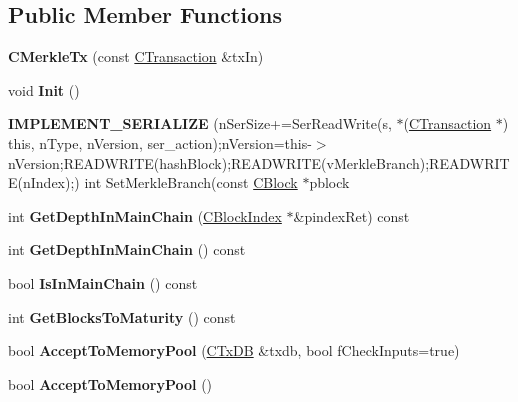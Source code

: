 \subsection*{Public Member Functions}
\begin{DoxyCompactItemize}
\item 
\mbox{\label{class_c_merkle_tx_aaf4aeddb032c6bb34559fa443bfc3476}} 
{\bfseries C\+Merkle\+Tx} (const \mbox{\hyperlink{class_c_transaction}{C\+Transaction}} \&tx\+In)
\item 
\mbox{\label{class_c_merkle_tx_ac57628e321f98642976d06b6cc231162}} 
void {\bfseries Init} ()
\item 
\mbox{\label{class_c_merkle_tx_a1cebdb140132c4af03a4cc264a21f118}} 
{\bfseries I\+M\+P\+L\+E\+M\+E\+N\+T\+\_\+\+S\+E\+R\+I\+A\+L\+I\+ZE} (n\+Ser\+Size+=Ser\+Read\+Write(s, $\ast$(\mbox{\hyperlink{class_c_transaction}{C\+Transaction}} $\ast$) this, n\+Type, n\+Version, ser\+\_\+action);n\+Version=this-\/$>$n\+Version;R\+E\+A\+D\+W\+R\+I\+TE(hash\+Block);R\+E\+A\+D\+W\+R\+I\+TE(v\+Merkle\+Branch);R\+E\+A\+D\+W\+R\+I\+TE(n\+Index);) int Set\+Merkle\+Branch(const \mbox{\hyperlink{class_c_block}{C\+Block}} $\ast$pblock
\item 
\mbox{\label{class_c_merkle_tx_a5c341e09db0ee897cef3a1ceba9fddf8}} 
int {\bfseries Get\+Depth\+In\+Main\+Chain} (\mbox{\hyperlink{class_c_block_index}{C\+Block\+Index}} $\ast$\&pindex\+Ret) const
\item 
\mbox{\label{class_c_merkle_tx_a297197f9fc39553e527de4eb6c995004}} 
int {\bfseries Get\+Depth\+In\+Main\+Chain} () const
\item 
\mbox{\label{class_c_merkle_tx_ad4b3623fabf1924dba2a7694e3418e1e}} 
bool {\bfseries Is\+In\+Main\+Chain} () const
\item 
\mbox{\label{class_c_merkle_tx_a69ebd437f7b44169659c3527fe73b6ab}} 
int {\bfseries Get\+Blocks\+To\+Maturity} () const
\item 
\mbox{\label{class_c_merkle_tx_ae4189c0dc060f1e6b1fb698c95577382}} 
bool {\bfseries Accept\+To\+Memory\+Pool} (\mbox{\hyperlink{class_c_tx_d_b}{C\+Tx\+DB}} \&txdb, bool f\+Check\+Inputs=true)
\item 
\mbox{\label{class_c_merkle_tx_ab0d9bb868a004d5e0b5a41fff3784ee2}} 
bool {\bfseries Accept\+To\+Memory\+Pool} ()
\end{DoxyCompactItemize}
